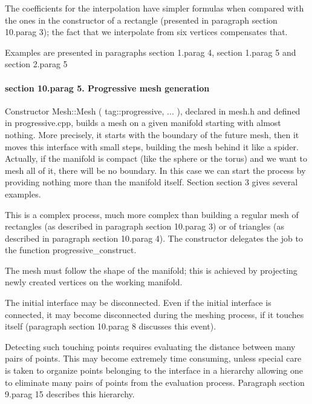 The coefficients for the interpolation have simpler formulas when compared with the ones in the
constructor of a rectangle (presented in paragraph \numb section 10.\numb parag 3);
the fact that we interpolate from six vertices compensates that.

Examples are presented in paragraphs \numb section 1.\numb parag 4, \numb section 1.\numb parag 5
and \numb section 2.\numb parag 5
\vfil\eject

\paragraph{\numb section 10.\numb parag 5. Progressive mesh generation}

Constructor {\codett Mesh::Mesh ( tag::progressive, ... )}, declared in {\codett mesh.h} and defined
in {\codett progressive.cpp}, builds a mesh on a given manifold starting with almost nothing.
More precisely, it starts with the boundary of the future mesh, then it
moves this interface with small steps, building the mesh behind it like a spider.
Actually, if the manifold is compact (like the sphere or the torus) and we want to mesh all of it,
there will be no boundary.
In this case we can start the process by providing nothing more than the manifold itself.
Section \numb section 3 gives several examples.

This is a complex process, much more complex than building a regular mesh of rectangles
(as described in paragraph \numb section 10.\numb parag 3) or of triangles (as described
in paragraph \numb section 10.\numb parag 4).
The constructor delegates the job to the function {\codett progressive\_construct}.

The mesh must follow the shape of the manifold; this is achieved by {\codett project}ing
newly created vertices on the working manifold.

The initial interface may be disconnected.
Even if the initial interface is connected, it may become disconnected during the meshing
process, if it touches itself (paragraph \numb section 10.\numb parag 8 discusses this event).

Detecting such touching points requires evaluating the distance between many pairs of points.
This may become extremely time consuming, unless special care is taken to organize points
belonging to the interface in a hierarchy allowing one to eliminate many pairs of points
from the evaluation process.
Paragraph \numb section 9.\numb parag 15 describes this hierarchy.

